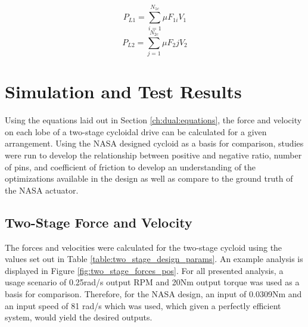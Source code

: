 \begin{equation} \label{eq:dual_power_loss_1}
P_{L1} = \sum_{i=1}^{N_{1c}}\mu F_{1i} V_1
\end{equation}
\begin{equation} \label{eq:dual_power_loss_2}
P_{L2} = \sum_{j=1}^{N_{2c}}\mu F_2j V_2
\end{equation}


\section{Simulation and Test Results} \label{ch:dual:test_results}

Using the equations laid out in Section \ref{ch:dual:equations}, the force and velocity on each lobe of a two-stage cycloidal drive can be calculated for a given arrangement. Using the NASA designed cycloid as a basis for comparison, studies were run to develop the relationship between positive and negative ratio, number of pins, and coefficient of friction to develop an understanding of the optimizations available in the design as well as compare to the ground truth of the NASA actuator. 

\subsection{Two-Stage Force and Velocity}\label{ch:dual:test_results:force_vel}

The forces and velocities were calculated for the two-stage cycloid using the values set out in Table \ref{table:two_stage_design_params}. An example analysis is displayed in Figure \ref{fig:two_stage_forces_pos}. For all presented analysis, a usage scenario of 0.25rad/s output RPM and 20Nm output torque was used as a basis for comparison. Therefore, for the NASA design, an input of 0.0309Nm and an input speed of 81 rad/s which was used, which given a perfectly efficient system, would yield the desired outputs. 

